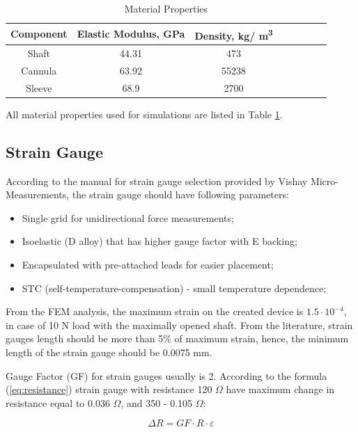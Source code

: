 \begin{table}
\caption {Material Properties} \label{tab:matProp} 
\begin{center}
\begin{tabular}{ | c | c | c | c | c | c | c | c | } 
\hline
Component & Elastic Modulus, GPa & Density, kg/ m\textsuperscript{3} \\ 
\hline
Shaft & 44.31 & 473\\ 
\hline
Cannula & 63.92 & 55238 \\ 
\hline
Sleeve & 68.9 & 2700  \\ 
\hline
\end{tabular}
\end{center}
\end{table}

All material properties used for simulations are listed in Table \ref{tab:matProp}.

\subsection{Strain Gauge}
	\label{sec:SGReq}
	According to the manual for strain gauge selection provided by Vishay Micro-Measurements, the strain gauge should have following parameters:
\begin{itemize}
  \item Single grid for unidirectional force measurements;
  \item Isoelastic (D alloy) that has higher gauge factor with E backing;
  \item Encapsulated with pre-attached leads for easier placement;
  \item STC (self-temperature-compensation) - small temperature dependence;
\end{itemize}    
    
From the FEM analysis, the maximum strain on the created device is $1.5 \cdot 10^{-4}$, in case of 10 N load with the maximally opened shaft. From the literature, strain gauges length should be more than 5\% of maximum strain, hence, the minimum length of the strain gauge should be 0.0075 mm. 

Gauge Factor (GF) for strain gauges usually is 2. According to the formula (\ref{eq:resistance}) strain gauge with resistance 120 $\Omega$ have maximum change in resistance equal to 0.036 $\Omega$, and 350  - 0.105 $\Omega$:

\begin{equation}\label{eq:resistance}
\Delta R=GF \cdot R \cdot \varepsilon
\end{equation}

